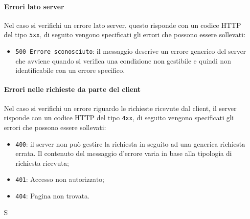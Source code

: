 \paragraph{Errori lato server}
Nel caso si verifichi un errore lato server, questo risponde con un codice HTTP del tipo \texttt{5xx}, di seguito vengono specificati gli errori che possono essere sollevati:
	\begin{itemize}
		\item \texttt{500 Errore sconosciuto}: il messaggio descrive un errore generico del server che avviene quando si verifica una condizione non gestibile e quindi non identificabile con un errore specifico.
	\end{itemize}
\paragraph{Errori nelle richieste da parte del client}
Nel caso si verifichi un errore riguardo le richieste ricevute dal client, il server risponde con un codice HTTP del tipo \texttt{4xx}, di seguito vengono specificati gli errori che possono essere sollevati:
	\begin{itemize}
		\item \texttt{400}: il server non può gestire la richiesta in seguito ad una generica richiesta errata. Il contenuto del messaggio d'errore varia in base alla tipologia di richiesta ricevuta;
		\item \texttt{401}: Accesso non autorizzato;
		\item \texttt{404}: Pagina non trovata.
	\end{itemize}S

